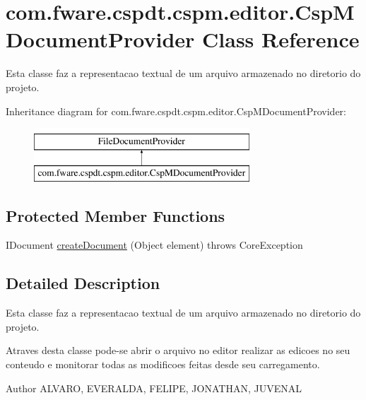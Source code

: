 \hypertarget{classcom_1_1fware_1_1cspdt_1_1cspm_1_1editor_1_1_csp_m_document_provider}{}\section{com.\+fware.\+cspdt.\+cspm.\+editor.\+Csp\+M\+Document\+Provider Class Reference}
\label{classcom_1_1fware_1_1cspdt_1_1cspm_1_1editor_1_1_csp_m_document_provider}


Esta classe faz a representacao textual de um arquivo armazenado no diretorio do projeto.  


Inheritance diagram for com.\+fware.\+cspdt.\+cspm.\+editor.\+Csp\+M\+Document\+Provider\+:\begin{figure}[H]
\begin{center}
\leavevmode
\includegraphics[height=2.000000cm]{classcom_1_1fware_1_1cspdt_1_1cspm_1_1editor_1_1_csp_m_document_provider}
\end{center}
\end{figure}
\subsection*{Protected Member Functions}
\begin{DoxyCompactItemize}
\item 
I\+Document \hyperlink{classcom_1_1fware_1_1cspdt_1_1cspm_1_1editor_1_1_csp_m_document_provider_aee079461064a45daaf96dcfd68df8ea1}{create\+Document} (Object element)  throws Core\+Exception 
\end{DoxyCompactItemize}


\subsection{Detailed Description}
Esta classe faz a representacao textual de um arquivo armazenado no diretorio do projeto. 

Atraves desta classe pode-\/se abrir o arquivo no editor realizar as edicoes no seu conteudo e monitorar todas as modificoes feitas desde seu carregamento.

\begin{DoxyAuthor}{Author}
A\+L\+V\+A\+RO, E\+V\+E\+R\+A\+L\+DA, F\+E\+L\+I\+PE, J\+O\+N\+A\+T\+H\+AN, J\+U\+V\+E\+N\+AL 
\end{DoxyAuthor}


